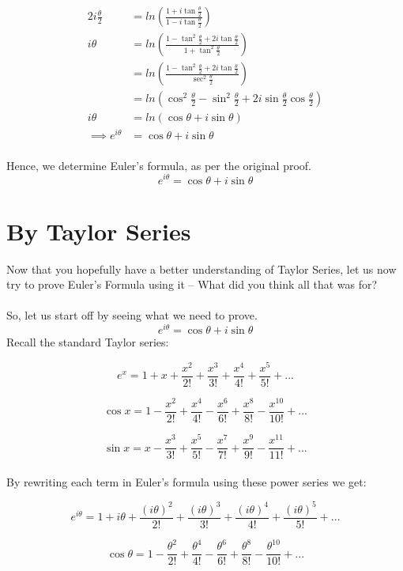 \documentclass[a4paper,12pt,oneside]{book}
\begin{document}
\begin{align*}
2i \frac{\theta}{2} &= ln \left (\frac{1 + i \tan \frac{\theta}{2}}{1 - i \tan \frac{\theta}{2}} \right ) \\
i \theta &= ln \left (\frac{1 - \tan^2 \frac{\theta}{2} + 2i \tan \frac{\theta}{2}}{1 + \tan^2 \frac{\theta}{2}} \right ) \\
&= ln \left (\frac{1 - \tan^2 \frac{\theta}{2} + 2i \tan \frac{\theta}{2}}{\sec^2 \frac{\theta}{2}} \right ) \\
&= ln \left ( \cos^2 \frac{\theta}{2} - \sin^2 \frac{\theta}{2} + 2i \sin\frac{\theta}{2} \cos\frac{\theta}{2} \right ) \\
i\theta &= ln \left ( \cos\theta + i\sin\theta \right ) \\
\implies e^{i\theta} &= \cos\theta + i\sin\theta
\end{align*} \\

Hence, we determine Euler's formula, as per the original proof.
\[ e^{i\theta} = \cos\theta + i\sin\theta \]

\newpage

\section{By Taylor Series}
Now that you hopefully have a better understanding of Taylor Series, let us now try to prove Euler's Formula using it -- What did you think all that was for?\\\\                 
So, let us start off by seeing what we need to prove.
$$e^{i\theta} = \cos\theta + i\sin\theta$$      
Recall the standard Taylor series:

$$e^{x} = 1 + x + \frac{x^2}{2!} + \frac{x^{3}}{3!} + \frac{x^{4}}{4!}  + \frac{x^{5}}{5!} + ...$$

$$\cos x = 1 - \frac{x^{2}}{2!} +\frac{x^{4}}{4!} - \frac{x^{6}}{6!} + \frac{x^{8}}{8!} - \frac{x^{10}}{10!} + ... $$

$$\sin x = x - \frac{x^{3}}{3!} + \frac{x^{5}}{5!} - \frac{x^{7}}{7!} + \frac{x^{9}}{9!} - \frac{x^{11}}{11!} + ...$$\\ 
By rewriting each term in Euler's formula using these power series we get:

$$e^{i\theta} = 1 + i\theta + \frac{(i\theta)^2}{2!} + \frac{(i\theta)^{3}}{3!} + \frac{(i\theta)^{4}}{4!} + \frac{(i\theta)^{5}}{5!} + ...$$


$$\cos \theta = 1 - \frac{\theta^{2}}{2!} +\frac{\theta^{4}}{4!} - \frac{\theta^{6}}{6!} + \frac{\theta^{8}}{8!} -  \frac{\theta^{10}}{10!} + ... $$
\end{document}
